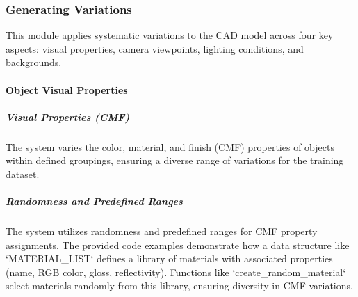 \documentclass[12pt]{report}
\begin{document}








\subsubsection{Generating Variations}
This module applies systematic variations to the CAD model across four key aspects: visual properties, camera viewpoints, lighting conditions, and backgrounds.

\paragraph{Object Visual Properties}

\subparagraph{Visual Properties (CMF)}
The system varies the color, material, and finish (CMF) properties of objects within defined groupings, ensuring a diverse range of variations for the training dataset.

\subparagraph{Randomness and Predefined Ranges}
The system utilizes randomness and predefined ranges for CMF property assignments. The provided code examples demonstrate how a data structure like `MATERIAL_LIST` defines a library of materials with associated properties (name, RGB color, gloss, reflectivity). Functions like `create_random_material` select materials randomly from this library, ensuring diversity in CMF variations.
\end{document}
